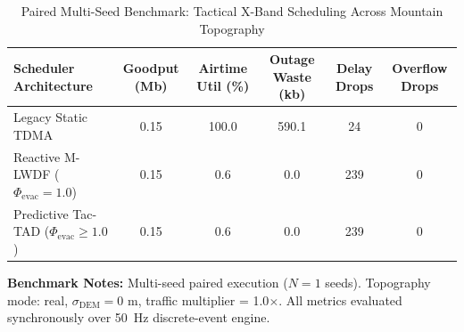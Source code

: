 \begin{table}[htbp]
\centering
\caption{Paired Multi-Seed Benchmark: Tactical X-Band Scheduling Across Mountain Topography}
\label{tab:tactical_benchmark_results}
\begin{tabular}{l ccccc}
\toprule
\textbf{Scheduler Architecture} & \textbf{Goodput (Mb)} & \textbf{Airtime Util (\%)} & \textbf{Outage Waste (kb)} & \textbf{Delay Drops} & \textbf{Overflow Drops} \\
\midrule
Legacy Static TDMA & 0.15 & 100.0 & 590.1 & 24 & 0 \\
Reactive M-LWDF ($\Phi_{\text{evac}} = 1.0$) & 0.15 & 0.6 & 0.0 & 239 & 0 \\
Predictive Tac-TAD ($\Phi_{\text{evac}} \ge 1.0$) & 0.15 & 0.6 & 0.0 & 239 & 0 \\
\bottomrule
\end{tabular}
\vspace{1ex}
{\footnotesize \raggedright \textbf{Benchmark Notes:} Multi-seed paired execution ($N = 1$ seeds). Topography mode: real, $\sigma_{\text{DEM}} = 0\text{ m}$, traffic multiplier = 1.0$\times$. All metrics evaluated synchronously over 50~Hz discrete-event engine.\par}
\end{table}